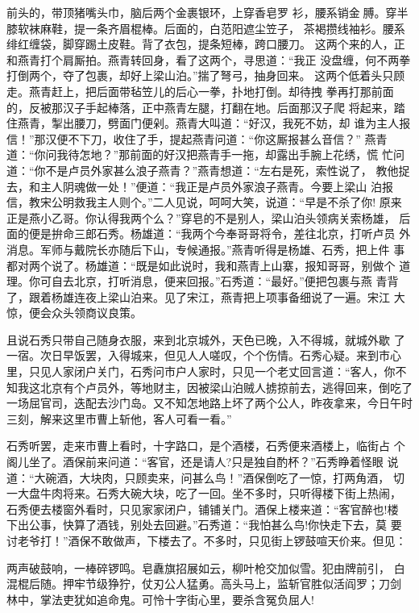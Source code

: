 前头的，带顶猪嘴头巾，脑后两个金裹银环，上穿香皂罗
衫，腰系销金膊。穿半膝软袜麻鞋，提一条齐眉棍棒。后面的，白范阳遮尘笠子，
茶褐攒线袖衫。腰系绯红缠袋，脚穿踢土皮鞋。背了衣包，提条短棒，跨口腰刀。
这两个来的人，正和燕青打个肩厮拍。燕青转回身，看了这两个，寻思道：“我正
没盘缠，何不两拳打倒两个，夺了包裹，却好上梁山泊。”揣了弩弓，抽身回来。
这两个低着头只顾走。燕青赶上，把后面带毡笠儿的后心一拳，扑地打倒。却待拽
拳再打那前面的，反被那汉子手起棒落，正中燕青左腿，打翻在地。后面那汉子爬
将起来，踏住燕青，掣出腰刀，劈面门便剁。燕青大叫道：“好汉，我死不妨，却
谁为主人报信！”那汉便不下刀，收住了手，提起燕青问道：“你这厮报甚么音信？”
燕青道：“你问我待怎地？”那前面的好汉把燕青手一拖，却露出手腕上花绣，慌
忙问道：“你不是卢员外家甚么浪子燕青？”燕青想道：“左右是死，索性说了，
教他捉去，和主人阴魂做一处！”便道：“我正是卢员外家浪子燕青。今要上梁山
泊报信，教宋公明救我主人则个。”二人见说，呵呵大笑，说道：“早是不杀了你!
原来正是燕小乙哥。你认得我两个么？”穿皂的不是别人，梁山泊头领病关索杨雄，
后面的便是拚命三郎石秀。杨雄道：“我两个今奉哥哥将令，差往北京，打听卢员
外消息。军师与戴院长亦随后下山，专候通报。”燕青听得是杨雄、石秀，把上件
事都对两个说了。杨雄道：“既是如此说时，我和燕青上山寨，报知哥哥，别做个
道理。你可自去北京，打听消息，便来回报。”石秀道：“最好。”便把包裹与燕
青背了，跟着杨雄连夜上梁山泊来。见了宋江，燕青把上项事备细说了一遍。宋江
大惊，便会众头领商议良策。

且说石秀只带自己随身衣服，来到北京城外，天色已晚，入不得城，就城外歇
了一宿。次日早饭罢，入得城来，但见人人嗟叹，个个伤情。石秀心疑。来到市心
里，只见人家闭户关门，石秀问市户人家时，只见一个老丈回言道：“客人，你不
知我这北京有个卢员外，等地财主，因被梁山泊贼人掳掠前去，逃得回来，倒吃了
一场屈官司，迭配去沙门岛。又不知怎地路上坏了两个公人，昨夜拿来，今日午时
三刻，解来这里市曹上斩他，客人可看一看。”

石秀听罢，走来市曹上看时，十字路口，是个酒楼，石秀便来酒楼上，临街占
个阁儿坐了。酒保前来问道：“客官，还是请人?只是独自酌杯？”石秀睁着怪眼
说道：“大碗酒，大块肉，只顾卖来，问甚么鸟！”酒保倒吃了一惊，打两角酒，
切一大盘牛肉将来。石秀大碗大块，吃了一回。坐不多时，只听得楼下街上热闹，
石秀便去楼窗外看时，只见家家闭户，铺铺关门。酒保上楼来道：“客官醉也!楼
下出公事，快算了酒钱，别处去回避。”石秀道：“我怕甚么鸟!你快走下去，莫
要讨老爷打！”酒保不敢做声，下楼去了。不多时，只见街上锣鼓喧天价来。但见：

两声破鼓响，一棒碎锣鸣。皂纛旗招展如云，柳叶枪交加似雪。犯由牌前引，
白混棍后随。押牢节级狰狞，仗刃公人猛勇。高头马上，监斩官胜似活阎罗；刀剑
林中，掌法吏犹如追命鬼。可怜十字街心里，要杀含冤负屈人!

